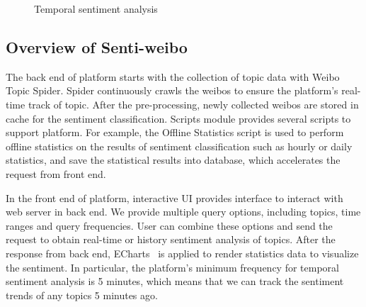 \documentclass[runningheads]{llncs}
\begin{document}
\begin{figure}[ht]
\centering  %
\caption{Temporal sentiment analysis}
\label{fig:sentiment-trend}
\end{figure}

\subsection{Overview of Senti-weibo}

The back end of platform starts with the collection of topic data with Weibo Topic Spider. Spider continuously crawls the weibos to ensure the platform's real-time track of topic. After the pre-processing, newly collected weibos are stored in cache for the sentiment classification. Scripts module provides several scripts to support platform. For example, the Offline Statistics script is used to perform offline statistics on the results of sentiment classification such as hourly or daily statistics, and save the statistical results into database, which accelerates the request from front end. 

In the front end of platform, interactive UI provides interface to interact with web server in back end. We provide multiple query options, including topics, time ranges and query frequencies. User can combine these options and send the request to obtain real-time or history sentiment analysis of topics. After the response from back end, ECharts~\cite{li2018echarts} is applied to render statistics data to visualize the sentiment. In particular, the platform's minimum frequency for temporal sentiment analysis is 5 minutes, which means that we can track the sentiment trends of any topics 5 minutes ago.
\end{document}
